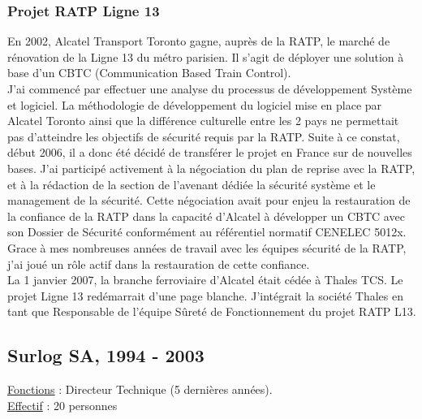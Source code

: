 \documentclass[a4paper,12pt]{article}
\begin{document}
\subsubsection{Projet RATP Ligne 13}
En 2002, Alcatel Transport Toronto gagne, aupr\`es de la RATP, le
march\'e de r\'enovation de la Ligne 13 du m\'etro parisien. Il s'agit
de d\'eployer une solution \`a base d'un CBTC (Communication Based
Train Control).
\\
J'ai commenc\'e par effectuer une analyse du processus de
d\'eveloppement Syst\`eme et logiciel. La m\'ethodologie de
d\'eveloppement du logiciel mise en place par Alcatel Toronto ainsi
que la diff\'erence culturelle entre les 2 pays ne permettait pas
d'atteindre les objectifs de s\'ecurit\'e requis par la RATP.  Suite
\`a ce constat, d\'ebut 2006, il a donc \'et\'e d\'ecid\'e de
transf\'erer le projet en France sur de nouvelles bases. J'ai
particip\'e activement \`a la n\'egociation du plan de reprise avec la
RATP, et \`a la r\'edaction de la section de l'avenant d\'edi\'ee la
s\'ecurit\'e syst\`eme et le management de la s\'ecurit\'e.  Cette
n\'egociation avait pour enjeu la restauration de la confiance de la
RATP dans la capacit\'e d'Alcatel \`a d\'evelopper un CBTC avec son
Dossier de S\'ecurit\'e conform\'ement au r\'ef\'erentiel normatif
CENELEC 5012x. Grace \`a mes nombreuses ann\'ees de travail avec les
\'equipes s\'ecurit\'e de la RATP, j'ai jou\'e un r\^ole actif dans la
restauration de cette confiance.
\\
La 1 janvier 2007, la branche ferroviaire d'Alcatel \'etait
c\'ed\'ee \`a Thales TCS. Le projet Ligne 13 red\'emarrait d'une page
blanche. J'int\'egrait la soci\'et\'e Thales en tant que Responsable
de l'\'equipe S\^uret\'e de Fonctionnement du projet RATP L13.


\subsection{Surlog SA, 1994 - 2003}
\hspace{-0.6cm}\underline{Fonctions} : Directeur Technique (5 derni\`eres ann\'ees).
\\
\underline{Effectif} : 20 personnes
\\
\end{document}

